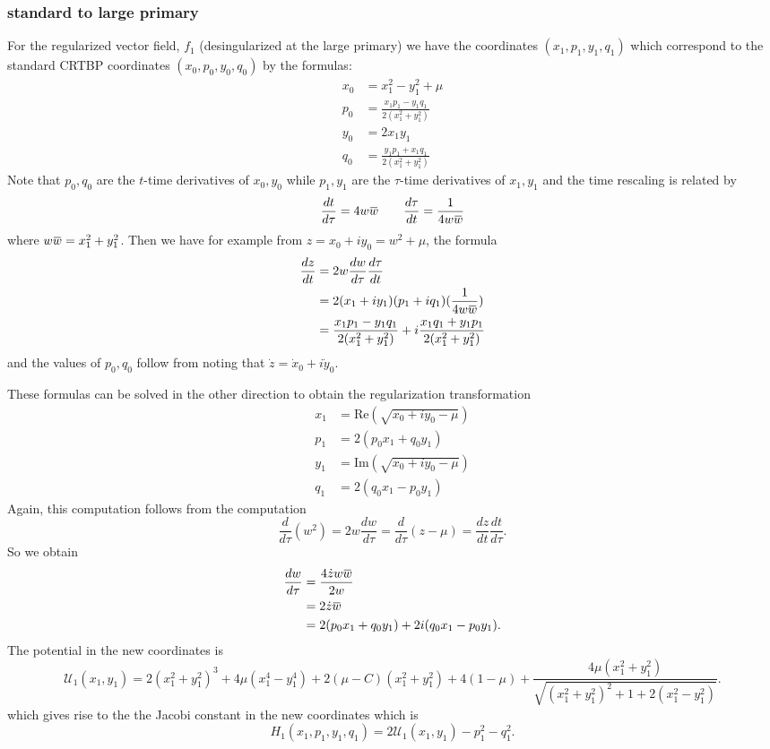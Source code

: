 \documentclass[10pt]{article}
\newcommand{\overbar}[1]{\mkern 1.5mu\overline{\mkern-1.5mu#1\mkern-1.5mu}\mkern 1.5mu}
\renewcommand{\Re}{\text{Re}}
\renewcommand{\Im}{\text{Im}}
\begin{document}
\subsubsection{standard to large primary}
For the regularized vector field, $f_1$ (desingularized at the large primary) we have the coordinates $(x_1,p_1,y_1,q_1)$ which correspond to the standard CRTBP coordinates $(x_0,p_0,y_0,q_0)$ by the formulas: 
\begin{align*}
\label{eq:f1_f0}
	x_0 & = x_1^2 - y_1^2 + \mu \\
	p_0 & = \frac{x_1p_1 - y_1q_1}{2(x_1^2 + y_1^2)} \\
	y_0 & = 2x_1y_1 \\
	q_0 & = \frac{y_1p_1 + x_1q_1}{2(x_1^2 + y_1^2)}
\end{align*}
Note that $p_0,q_0$ are the $t$-time derivatives of $x_0,y_0$ while $p_1,y_1$ are the $\tau$-time derivatives of $x_1,y_1$ and the time rescaling is related by 
\[
\frac{dt}{d \tau} = 4w \overbar{w} \qquad   \frac{d \tau }{dt} = \frac{1}{4 w \overbar{w}}
\]
where $w \overbar{w} = x_1^2 + y_1^2$.
Then we have for example from $z = x_0 + iy_0 = w^2 + \mu$, the formula 
\begin{align*}
\frac{dz}{dt} & = 2 w \frac{dw}{d \tau}\frac{d\tau}{dt} \\
& = 2(x_1 + iy_1)(p_1 + iq_1)(\frac{1}{4 w \overbar{w}}) \\
& = \frac{x_1p_1 - y_1q_1}{2(x_1^2 + y_1^2)} + i \frac{x_1q_1 + y_1p_1}{2(x_1^2 + y_1^2)}
\end{align*}
and the values of $p_0,q_0$ follow from noting that $\dot z = \dot x_0 + i\dot y_0$.

These formulas can be solved in the other direction to obtain the regularization transformation
\begin{align*}
	x_1 & =  \Re\left(\sqrt{x_0 + iy_0 - \mu}\right) \\
	p_1 & = 2(p_0x_1 + q_0y_1) \\
	y_1 & = \Im\left(\sqrt{x_0 + iy_0 - \mu}\right) \\
	q_1 & = 2(q_0x_1 - p_0y_1)
\end{align*}
Again, this computation follows from the computation
\[
\frac{d}{d \tau}(w^2) = 2w \frac{dw}{d \tau} = \frac{d}{d \tau} (z - \mu) = \frac{dz}{dt} \frac{dt}{d \tau}.
\]
So we obtain 
\begin{align*}
\frac{dw}{d \tau} & = \frac{4 \dot z w \overbar w}{2w} \\
& =2 \dot z \overbar w \\
& = 2(p_0 x_1 + q_0 y_1) + 2i(q_0 x_1 - p_0 y_1). 
\end{align*}
The potential in the new coordinates is 
\[
\mathcal{U}_1(x_1,y_1) =  2 ( x_1^2 + y_1^2 )^3 + 4\mu ( x_1^4 - y_1^4 ) + 2( \mu - C ) ( x_1^2 + y_1^2 ) + 4 ( 1 - \mu ) + \frac { 4 \mu ( x_1^2 + y_1^2 ) } { \sqrt { ( x_1^2 + y_1^2 )^2 + 1 + 2 ( x_1^2 - y_1^2 ) } }.
\]
which gives rise to the the Jacobi constant in the new coordinates which is
\[
H_1(x_1,p_1,y_1,q_1) = 2\mathcal{U}_1(x_1,y_1) - p_1^2 - q_1^2.
\]
\end{document}
